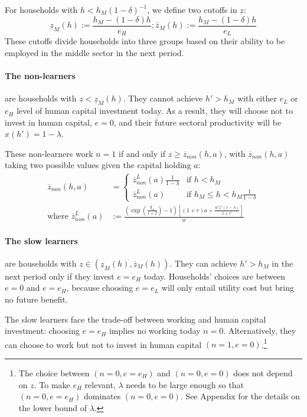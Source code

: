\documentclass[12pt]{article}
\begin{document}
For households with $h<h_M(1-\delta)^{-1}$, we define two cutoffs in $z$:
\begin{equation}\label{eq:zm}
    \underline{z}_M(h):=\frac{h_M-(1-\delta)h}{e_H}; \overline{z}_M(h):=\frac{h_M-(1-\delta)h}{e_L} 
\end{equation}
These cutoffs divide households into three groups based on their ability to be employed in the middle sector in the next period.

\paragraph{The non-learners} are households with $z < \underline{z}_M(h)$. They cannot achieve $h' > h_M$ with either $e_L$ or $e_H$ level of human capital investment today. As a result, they will choose not to invest in human capital, $e=0$, and their future sectoral productivity will be $x(h')=1-\lambda$. 

These non-learners work $n=1$ if and only if $z\geq \overline{z}_{non}(h,a)$, with $\overline{z}_{non}(h,a)$ taking two possible values given the capital holding $a$:
\begin{align}
\overline{z}_{non}(h,a)&=\left \{ 
\begin{array}{cl}
\overline{z}^L_{non}(a)\frac{1}{1-\lambda}  & \text{if }h<h_{M} \\ 
\overline{z}^L_{non}(a) & \text{if }h_{M} \leq h<h_M\frac{1}{1-\delta}
\end{array}%
\right. \\
\text{where }\overline{z}^L_{non}(a)&:=\frac{(\exp(\frac{\chi_n}{1+\beta})-1)[(1+r)a+\frac{w'z'(1-\lambda)}{1+r'}]}{w}  \label{eq:z-non}
\end{align}

\paragraph{The slow learners} are households with $z \in (\underline{z}_M(h), \overline{z}_M(h))$. They can achieve $h' > h_M$ in the next period only if they invest $e = e_H$ today. Households' choices are between $e=0$ and $e=e_H$, because choosing $e=e_L$ will only entail utility cost but bring no future benefit.  

The slow learners face the trade-off between working and human capital investment: choosing $e=e_H$ implies no working today $n=0$. Alternatively, they can choose to work but not to invest in human capital $(n=1,e=0)$.\footnote{The choice between $(n=0,e=e_H)$ and $(n=0,e=0)$ does not depend on $z$. To make $e_H$ relevant, $\lambda$ needs to be large enough so that $(n=0,e=e_H)$ dominates $(n=0,e=0)$. See Appendix for the details on the lower bound of $\lambda$.} 
\end{document}
